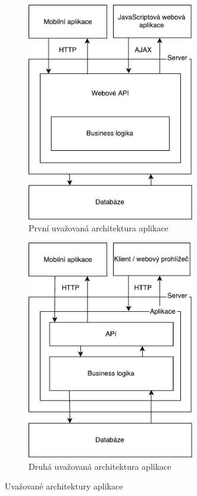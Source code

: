 \begin{figure}[!h]\centering
    \begin{subfigure}[!h]{0.45\textwidth}
        \centering
        \includegraphics[width=0.8\textwidth]{media/architecture-a.pdf}
        \caption{První uvažovaná architektura aplikace}
        \label{fig:architecture1}
    \end{subfigure}
    \begin{subfigure}[!h]{0.45\textwidth}
        \centering
        \includegraphics[width=0.8\textwidth]{media/architecture-b.pdf}
        \caption{Druhá uvažovaná architektura aplikace}
        \label{fig:architecture2}
    \end{subfigure}
    \caption{Uvažované architektury aplikace}
\end{figure}